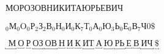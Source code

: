 \documentclass[a4paper, fontsize=12pt]{article}
\begin{document}
\section{}

МОРОЗОВНИКИТАЮРЬЕВИЧ

\noindent $ _0\text{М}_0\text{O}_0\text{Р}_2\text{З}_2\text{В}_0\text{Н}_0\text{И}_0\text{К}_7
\text{Т}_0\text{А}_0\text{Ю}_3\text{Ь}_0\text{Е}_0\text{В}_7\text{Ч}0\$$

\noindent $\underbracket{\text{\ М}}\ \underbracket{\text{О}}\ \underbracket{\text{Р}}\ 
\underbracket{\text{ОЗ}}\ \underbracket{\text{ОВ}}\ \underbracket{\text{Н}}\ \underbracket{\text{И}}\ 
\underbracket{\text{К}}\ \underbracket{\text{ИТ}}\ \underbracket{\text{А}}\ \underbracket{\text{Ю}}\ 
\underbracket{\text{РЬ}}\ \underbracket{\text{Е}}\ \underbracket{\text{В}}\ \underbracket{\text{ИЧ} }\ 
\underbracket{ \text{\$}}$

\section{}
\end{document}
